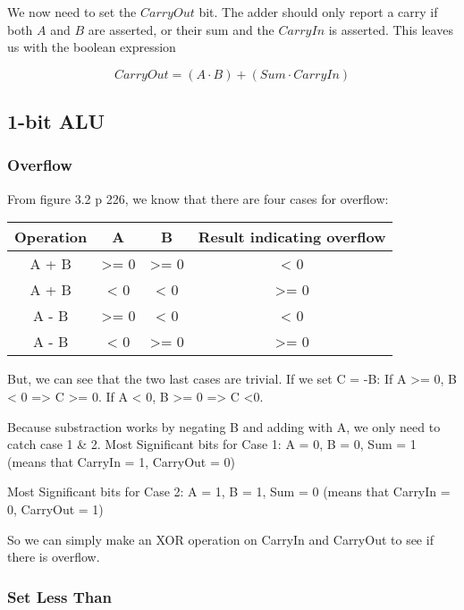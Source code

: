 \documentclass[11pt,a4paper]{article}
\begin{document}
We now need to set the $CarryOut$ bit. The adder should only report a
carry if both $A$ and $B$ are asserted, or their sum and the $CarryIn$ is asserted.
This leaves us with the boolean expression

\begin{equation*}
    CarryOut = (A \cdot B) + (Sum \cdot CarryIn)
\end{equation*}


\subsection*{1-bit ALU} %
\label{sub:1-bit_ALU}

\subsubsection*{Overflow}

From figure 3.2 p 226, we know that there are four cases for overflow:
\begin{table}[htb!]
\begin{tabular}{| c | c | c | c |}
    \centering
    Operation & A & B & Result indicating overflow \\ \hline
    A + B & >= 0 & >= 0 & < 0 \\
    A + B & < 0 & < 0 & >= 0 \\
    A - B & >= 0 & < 0 & < 0 \\
    A - B & < 0 & >= 0 & >= 0 \\
\end{tabular}
\end{table}

But, we can see that the two last cases are trivial. If we set C = -B:
If A >= 0, B < 0 => C >= 0.
If A < 0, B >= 0 => C <0.

Because substraction works by negating B and adding with A, we only need to catch case 1 \& 2.
Most Significant bits for Case 1:
A = 0, B = 0, Sum = 1 (means that CarryIn = 1, CarryOut = 0)

Most Significant bits for Case 2:
A = 1, B = 1, Sum = 0 (means that CarryIn = 0, CarryOut = 1)

So we can simply make an XOR operation on CarryIn and CarryOut to see if there is overflow.


\subsubsection*{Set Less Than}
\end{document}
